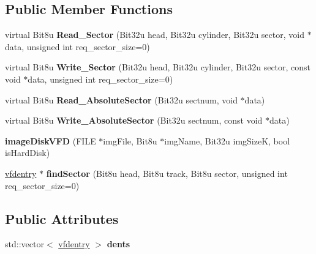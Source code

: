 \subsection*{Public Member Functions}
\begin{DoxyCompactItemize}
\item 
\hypertarget{classimageDiskVFD_a1ef305c459f06f598f2926e1dde9d89e}{virtual Bit8u {\bfseries Read\-\_\-\-Sector} (Bit32u head, Bit32u cylinder, Bit32u sector, void $\ast$data, unsigned int req\-\_\-sector\-\_\-size=0)}\label{classimageDiskVFD_a1ef305c459f06f598f2926e1dde9d89e}

\item 
\hypertarget{classimageDiskVFD_a6586ed26ebdf6047e7f38d0ee60cf013}{virtual Bit8u {\bfseries Write\-\_\-\-Sector} (Bit32u head, Bit32u cylinder, Bit32u sector, const void $\ast$data, unsigned int req\-\_\-sector\-\_\-size=0)}\label{classimageDiskVFD_a6586ed26ebdf6047e7f38d0ee60cf013}

\item 
\hypertarget{classimageDiskVFD_a1bac8eb8cf34c0445b71d3966913f9cf}{virtual Bit8u {\bfseries Read\-\_\-\-Absolute\-Sector} (Bit32u sectnum, void $\ast$data)}\label{classimageDiskVFD_a1bac8eb8cf34c0445b71d3966913f9cf}

\item 
\hypertarget{classimageDiskVFD_a05002b54d3dced2bd68f386811e7d4bc}{virtual Bit8u {\bfseries Write\-\_\-\-Absolute\-Sector} (Bit32u sectnum, const void $\ast$data)}\label{classimageDiskVFD_a05002b54d3dced2bd68f386811e7d4bc}

\item 
\hypertarget{classimageDiskVFD_a3d6b992a66cfce052569551fca9e137c}{{\bfseries image\-Disk\-V\-F\-D} (F\-I\-L\-E $\ast$img\-File, Bit8u $\ast$img\-Name, Bit32u img\-Size\-K, bool is\-Hard\-Disk)}\label{classimageDiskVFD_a3d6b992a66cfce052569551fca9e137c}

\item 
\hypertarget{classimageDiskVFD_a0e61e48ac744071eff28326e6d987227}{\hyperlink{structimageDiskVFD_1_1vfdentry}{vfdentry} $\ast$ {\bfseries find\-Sector} (Bit8u head, Bit8u track, Bit8u sector, unsigned int req\-\_\-sector\-\_\-size=0)}\label{classimageDiskVFD_a0e61e48ac744071eff28326e6d987227}

\end{DoxyCompactItemize}
\subsection*{Public Attributes}
\begin{DoxyCompactItemize}
\item 
\hypertarget{classimageDiskVFD_a9c11050c08b54c30cdb65f9c4250c856}{std\-::vector$<$ \hyperlink{structimageDiskVFD_1_1vfdentry}{vfdentry} $>$ {\bfseries dents}}\label{classimageDiskVFD_a9c11050c08b54c30cdb65f9c4250c856}

\end{DoxyCompactItemize}


